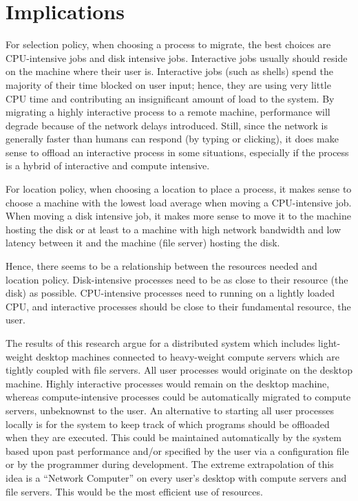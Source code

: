 \documentclass{report}
\begin{document}
\section{Implications}
\label{sec:policies}

For selection policy, when choosing a process to migrate, the best choices
are CPU-intensive jobs and disk intensive jobs.  Interactive jobs usually
should reside on the machine where their user is.  Interactive jobs (such as
shells) spend the majority of their time blocked on user input; hence, they
are using very little CPU time and contributing an insignificant amount of
load to the system.  By migrating a highly interactive process to a remote
machine, performance will degrade because of the network delays introduced.
Still, since the network is generally faster than humans can respond (by
typing or clicking), it does make sense to offload an interactive process in
some situations, especially if the process is a hybrid of interactive and
compute intensive.

For location policy, when choosing a location to place a process, it makes
sense to choose a machine with the lowest load average when moving a
CPU-intensive job.  When moving a disk intensive job, it makes more sense to
move it to the machine hosting the disk or at least to a machine with high
network bandwidth and low latency between it and the machine (file server)
hosting the disk.

Hence, there seems to be a relationship between the resources needed and
location policy.  Disk-intensive processes need to be as close to their
resource (the disk) as possible.  CPU-intensive processes need to running
on a lightly loaded CPU, and interactive processes should be close to their
fundamental resource, the user.

The results of this research argue for a distributed system which includes
light-weight desktop machines connected to heavy-weight compute servers
which are tightly coupled with file servers.  All user processes would
originate on the desktop machine.  Highly interactive processes would remain
on the desktop machine, whereas compute-intensive processes could be
automatically migrated to compute servers, unbeknownst to the user.  An
alternative to starting all user processes locally is for the system to keep
track of which programs should be offloaded when they are executed.  This
could be maintained automatically by the system based upon past performance
and/or specified by the user via a configuration file or by the programmer
during development.  The extreme extrapolation of this idea is a ``Network
Computer'' on every user's desktop with compute servers and file servers.
This would be the most efficient use of resources.
\end{document}
